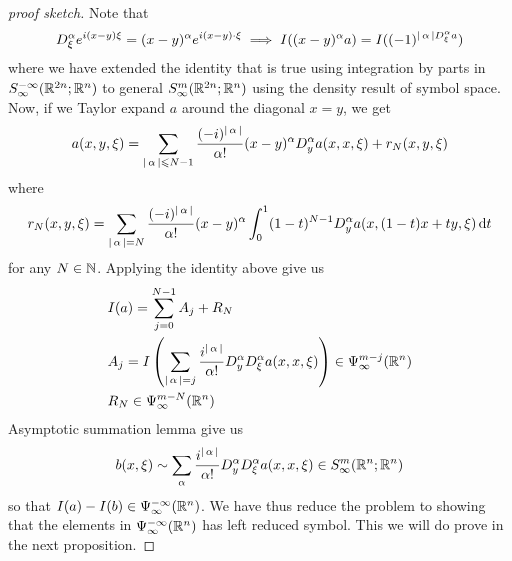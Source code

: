 \documentclass[12pt]{article}
\begin{document}
\begin{proof}[proof sketch] 
    Note that 
    \begin{align*}
        D_\xi^\alpha e^{i(x- y) \xi} = (x - y)^\alpha e^{i(x -y) \cdot \xi} \implies I((x -y)^\alpha a) = I((-1)^{\abs{\alpha}D_\xi^\alpha a})
    \end{align*}
    where we have extended the identity that is true using integration by parts in $S^{-\infty}_\infty(\R^{2n}; \R^n)$ to general $S^{m}_\infty(\R^{2n}; \R^n)$ using the density result of symbol space. Now, if we Taylor expand $a$ around the diagonal $x =y$, we get 
    \begin{align*}
        a(x, y, \xi) = \sum_{\abs{\alpha} \leq N -1} \frac{(-i)^{\abs{\alpha}}}{\alpha !} (x - y)^\alpha D^\alpha_ya (x, x, \xi) + r_N(x, y, \xi)
    \end{align*}
    where 
    \begin{align*}
        r_N(x, y, \xi) = \sum_{\abs{\alpha} = N} \frac{(-i)^{\abs{\alpha}}}{\alpha !} (x - y)^\alpha \int_0^1 (1 - t)^{N -1} D^\alpha_ya(x, (1 -t)x + ty, \xi) \d[t]
    \end{align*}
    for any $N \in \N$.  Applying the identity above give us 
    \begin{align*}
        &I(a) = \sum_{j = 0}^{N -1} A_j + R_N \\
        &A_j = I\brac{\sum_{\abs{\alpha} = j} \frac{i^{\abs{\alpha}}}{\alpha !} D^\alpha_y D^\alpha_\xi a (x, x, \xi)} \in \Psi^{m - j}_\infty(\R^n)\\
        &R_N \in \Psi^{m -N}_\infty(\R^n)
    \end{align*}
    Asymptotic summation lemma give us 
    \begin{align*}
        b(x, \xi) \sim \sum_{\alpha} \frac{i^{\abs{\alpha}}}{\alpha !} D^\alpha_y D^\alpha_\xi a (x, x, \xi) \in S^{m}_\infty(\R^{n}; \R^n)
    \end{align*}
    so that $I(a) - I(b) \in \Psi^{-\infty}_\infty(\R^n)$. We have thus reduce the problem to showing that the elements in $\Psi^{-\infty}_{\infty}(\R^n)$ has left reduced symbol. This we will do prove in the next proposition. 
    
\end{proof}
\end{document}
